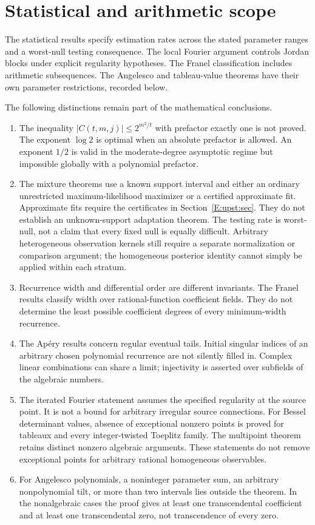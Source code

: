 \documentclass[11pt,a4paper]{article}
\theoremstyle{definition}
\theoremstyle{remark}
\numberwithin{equation}{section}
\begin{document}
\section{Statistical and arithmetic scope}
\label{E:end:scope}

The statistical results specify estimation rates across the stated
parameter ranges and a worst-null testing consequence. The local Fourier
argument controls Jordan blocks under explicit regularity hypotheses.
The Franel classification includes arithmetic subsequences. The
Angelesco and tableau-value theorems have their own parameter
restrictions, recorded below.

The following distinctions remain part of the mathematical conclusions.
\begin{enumerate}[leftmargin=*]
\item The inequality $|C(t,m,j)|\le2^{m^2/t}$ with prefactor exactly
one is not proved. The exponent $\log2$ is optimal when an absolute
prefactor is allowed. An exponent $1/2$ is valid in the moderate-degree
asymptotic regime but impossible globally with a polynomial prefactor.
\item The mixture theorems use a known support interval and either an ordinary
unrestricted maximum-likelihood maximizer or a certified approximate fit. Approximate fits require the certificates in Section~\ref{E:upst:sec}.
They do not establish an unknown-support adaptation theorem. The testing rate is worst-null,
not a claim that every fixed null is equally difficult. Arbitrary
heterogeneous observation kernels still require a separate normalization
or comparison argument; the homogeneous posterior identity cannot simply
be applied within each stratum.
\item Recurrence width and differential order are different invariants.
The Franel results classify width over rational-function coefficient
fields. They do not determine the least possible coefficient degrees
of every minimum-width recurrence.
\item The Ap\'ery results concern regular eventual tails. Initial
singular indices of an arbitrary chosen polynomial recurrence are not
silently filled in. Complex linear combinations can share a limit;
injectivity is asserted over subfields of the algebraic numbers.
\item The iterated Fourier statement assumes the specified regularity
at the source point. It is not a bound for arbitrary irregular source
connections. For Bessel determinant values, absence of exceptional nonzero
points is proved for tableaux and every integer-twisted Toeplitz family.
The multipoint theorem retains distinct nonzero algebraic arguments.
These statements do not remove exceptional points for arbitrary rational
homogeneous observables.
\item For Angelesco polynomials, a noninteger parameter sum, an
arbitrary nonpolynomial tilt, or more than two intervals lies outside
the theorem. In the nonalgebraic cases the proof gives at least one
transcendental coefficient and at least one transcendental zero, not
transcendence of every zero.
\end{enumerate}
\end{document}
